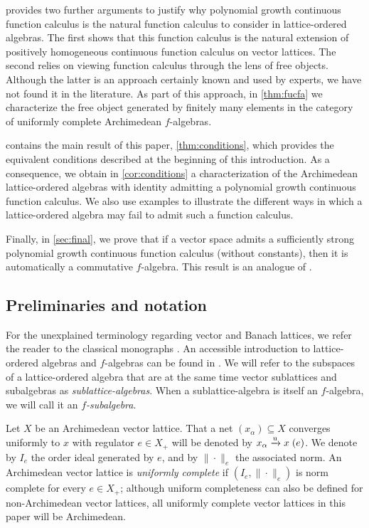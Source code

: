 \documentclass{amsart}
\theoremstyle{plain}
\theoremstyle{definition}
\theoremstyle{remark}
\newcommand{\falg}{$f\!$-algebra}
\newcommand{\fsubalg}{$f\!$-subalgebra}
\newcommand{\ulim}[3]{#1 \xrightarrow{\rm u} #2\;(#3)}
\begin{document}
 provides two further arguments to justify why
polynomial growth continuous function calculus is the natural function
calculus to consider in lattice-ordered algebras. The first shows that
this function calculus is the natural extension of positively
homogeneous continuous function calculus on vector lattices. The
second relies on viewing function calculus through the lens of free
objects. Although the latter is an approach certainly known and used
by experts, we have not found it in the literature. As part of this
approach, in \cref{thm:fucfa} we characterize the free object
generated by finitely many elements in the category of uniformly
complete Archimedean \falg s.

 contains the main result of this paper,
\cref{thm:conditions}, which provides the equivalent conditions
described at the beginning of this introduction.
As a consequence, we obtain in \cref{cor:conditions} a
characterization of the Archimedean lattice-ordered algebras with
identity admitting a polynomial growth continuous function calculus.
We also use examples to illustrate the different ways in which a
lattice-ordered algebra may fail to admit such a function
calculus.

Finally, in \cref{sec:final}, we prove that if a vector space admits a
sufficiently strong polynomial growth continuous function
calculus (without constants), then it is automatically a commutative \falg. This result is
an analogue of \cite[Theorem 1.4]{laustsen_troitsky2020}.

\subsection{Preliminaries and notation}

For the unexplained terminology regarding vector and Banach lattices,
we refer the reader to the classical monographs
\cite{aliprantis_burkinshaw2006,meyer-nieberg1991}. An accessible
introduction to lattice-ordered algebras and \falg s can be found in
\cite{huijsmans1991}. We will refer to the subspaces of a lattice-ordered algebra that
are at the same time vector sublattices and subalgebras as
\emph{sublattice-algebras}. When a sublattice-algebra is itself an
\falg, we will call it an \emph{\fsubalg}.

Let $X$ be an Archimedean vector lattice. That a net
$(x_\alpha )\subseteq X$ converges uniformly to $x$ with regulator $e
\in X_+$ will be denoted by $\ulim{x_\alpha }{x}{e}$. We denote by
$I_e$ the order ideal generated by $e$, and by $\|{\cdot }\|_e$ the
associated norm. An Archimedean vector lattice is \emph{uniformly
complete} if $(I_e,\|{\cdot }\|_e)$ is norm complete for every $e \in
X_+$; although uniform completeness can also be defined for
non-Archimedean vector lattices, all uniformly complete vector
lattices in this paper will be Archimedean.
\end{document}
